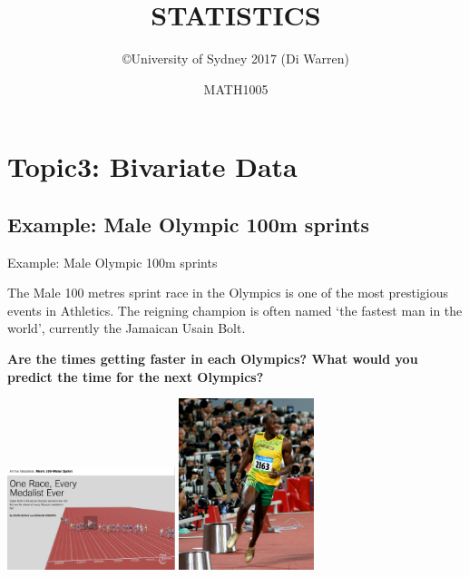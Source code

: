 \documentclass[t,xcolor=pdftex,dvipsnames,table]{beamer}
\title{\Huge STATISTICS}
\subtitle{}
\author{\copyright University of Sydney 2017 (Di Warren)}
\date{MATH1005}
\begin{document}
\section[3]{Topic3: Bivariate Data}

\subsection[]{Example: Male Olympic 100m sprints}
\begin{frame}[fragile]{Example: Male Olympic 100m sprints}

The Male 100 metres sprint race in the Olympics is one of the most prestigious events in Athletics. The reigning champion is often named `the fastest man in the world', currently the Jamaican Usain Bolt. 

\vspace{.5cm}
{\bf Are the times getting faster in each Olympics? What would you predict the time for the next Olympics?}

\includegraphics[height=3cm]{../images/Olympics100m.jpg}
\includegraphics[height=5cm]{../images/UsainBolt.jpg}

\href{http://www.nytimes.com/interactive/2012/08/05/sports/olympics/the-100-meter-dash-one-race-every-medalist-ever.html}{}
\end{frame}
\end{document}

